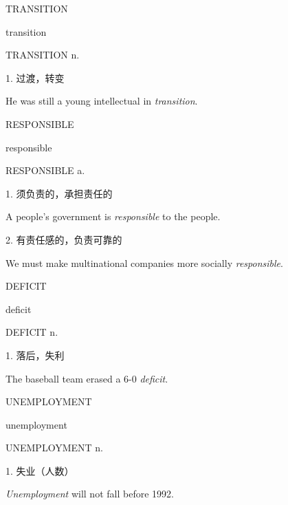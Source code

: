 \begin{flashcard}{
TRANSITION

transition
}
\begin{center}
TRANSITION n. 
\end{center}
1. 过渡，转变

He was still a young intellectual in \textit{transition}.

\end{flashcard}
\begin{flashcard}{
RESPONSIBLE

responsible
}
\begin{center}
RESPONSIBLE a. 
\end{center}
1. 须负责的，承担责任的

A people's government is \textit{responsible} to the people.

2. 有责任感的，负责可靠的

We must make multinational companies more socially \textit{responsible}.

\end{flashcard}
\begin{flashcard}{
DEFICIT

deficit
}
\begin{center}
DEFICIT n. 
\end{center}
1. 落后，失利

The baseball team erased a 6-0 \textit{deficit}.

\end{flashcard}
\begin{flashcard}{
UNEMPLOYMENT

unemployment
}
\begin{center}
UNEMPLOYMENT n. 
\end{center}
1. 失业（人数）

\textit{Unemployment} will not fall before 1992.

\end{flashcard}
